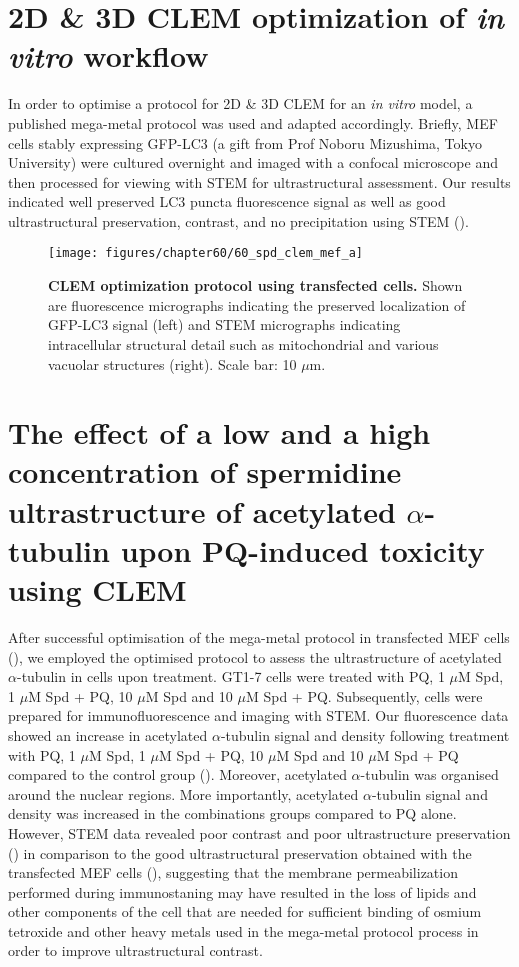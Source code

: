 \section{2D \& 3D CLEM optimization of \textit{in vitro} workflow}
In order to optimise a protocol for 2D \& 3D CLEM for an \textit{in vitro} model, a published mega-metal protocol was used \citep{Russell2017} and adapted accordingly. Briefly, MEF cells stably expressing GFP-LC3 (a gift from Prof Noboru Mizushima, Tokyo University) were cultured overnight and imaged with a confocal microscope and then processed for viewing with STEM for ultrastructural assessment. Our results indicated well preserved LC3 puncta fluorescence signal as well as  good ultrastructural preservation, contrast, and no precipitation using STEM (). 

\begin{figure}[!htbp]
\centering
 \texttt{[image: figures/chapter60/60\_spd\_clem\_mef\_a]}
 \caption[CLEM optimization protocol using transfected cells]{\textbf{CLEM optimization protocol using transfected cells.} Shown are fluorescence micrographs indicating the preserved localization of GFP-LC3 signal (left) and STEM micrographs indicating intracellular structural detail such as mitochondrial and various vacuolar structures (right). Scale bar: 10 $\mu$m.}
 \label{fig:60_spd_clem_mef_a}
\end{figure} 

\section{The effect of a low and a high concentration of spermidine ultrastructure of acetylated $\alpha$-tubulin upon PQ-induced toxicity using CLEM}
\label{sec:Effect_low_high_spermidine_localization_ultrastructure of_tubulin_CLEM}
After successful optimisation of the mega-metal protocol in transfected MEF cells (), we employed the optimised protocol to assess the ultrastructure of acetylated $\alpha$-tubulin in cells upon treatment. GT1-7 cells were treated with PQ, 1 $\mu$M Spd, 1 $\mu$M Spd + PQ, 10 $\mu$M Spd and 10 $\mu$M Spd + PQ. Subsequently, cells were prepared for immunofluorescence and imaging with STEM. Our fluorescence data showed an increase in acetylated $\alpha$-tubulin signal and density following treatment with PQ, 1 $\mu$M Spd, 1 $\mu$M Spd + PQ, 10 $\mu$M Spd and 10 $\mu$M Spd + PQ compared to the control group (). Moreover, acetylated $\alpha$-tubulin was organised around the nuclear regions. More importantly, acetylated $\alpha$-tubulin signal and density was increased in the combinations groups compared to PQ alone. However, STEM data revealed poor contrast and poor ultrastructure preservation () in comparison to the good ultrastructural preservation obtained with the transfected MEF cells (), suggesting that the membrane permeabilization performed during immunostaning may have resulted in the loss of lipids and other components of the cell that are needed for sufficient binding of osmium tetroxide and other heavy metals used in the mega-metal protocol process in order to improve ultrastructural contrast. 

